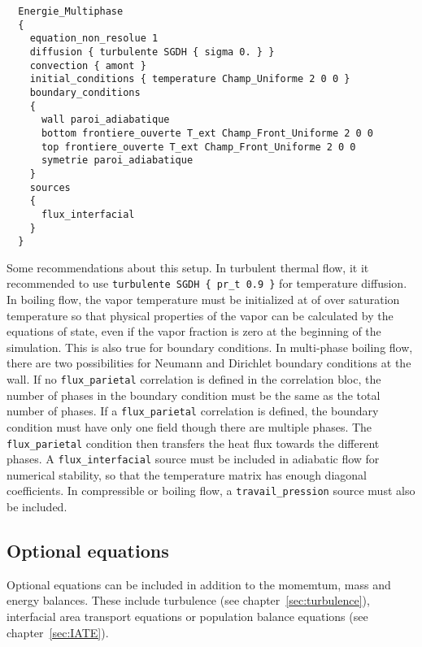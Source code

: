 \begin{lstlisting}
  Energie_Multiphase
  {
    equation_non_resolue 1
    diffusion { turbulente SGDH { sigma 0. } }
    convection { amont }
    initial_conditions { temperature Champ_Uniforme 2 0 0 }
    boundary_conditions
    {
      wall paroi_adiabatique
      bottom frontiere_ouverte T_ext Champ_Front_Uniforme 2 0 0
      top frontiere_ouverte T_ext Champ_Front_Uniforme 2 0 0
      symetrie paroi_adiabatique
    }
    sources
    {
      flux_interfacial
    }
  }
\end{lstlisting}
Some recommendations about this setup. In turbulent thermal flow, it it recommended to use \texttt{turbulente SGDH \{ pr_t 0.9 \}} for temperature diffusion.
In boiling flow, the vapor temperature must be initialized at of over saturation temperature so that physical properties of the vapor can be calculated by the equations of state, even if the vapor fraction is zero at the beginning of the simulation. This is also true for boundary conditions.
In multi-phase boiling flow, there are two possibilities for Neumann and Dirichlet boundary conditions at the wall. If no \texttt{flux\_parietal} correlation is defined in the correlation bloc, the number of phases in the boundary condition must be the same as the total number of phases. If a \texttt{flux\_parietal} correlation is defined, the boundary condition must have only one field though there are multiple phases. The \texttt{flux\_parietal} condition then transfers the heat flux towards the different phases. A \texttt{flux\_interfacial} source must be included in adiabatic flow for numerical stability, so that the temperature matrix has enough diagonal coefficients.
In compressible or boiling flow, a \texttt{travail\_pression} source must also be included.

\subsection{Optional equations}

Optional equations can be included in addition to the momemtum, mass and energy balances.
These include turbulence (see chapter~\ref{sec:turbulence}), interfacial area transport equations or population balance equations (see chapter~\ref{sec:IATE}).

